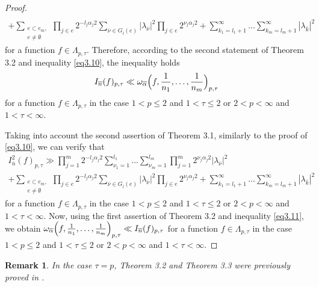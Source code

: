 \documentclass[12pt]{article}
\theoremstyle{plain}
\newtheorem{rem}{Remark}[section]
\begin{document}
\begin{proof}
\begin{multline}
 \\
  + \sum_{\substack{e\subset e_{m},\\ e\neq \emptyset}} \prod_{j\in e}2^{-l_{j}\alpha_{j}2}\sum\limits_{\overline{\nu}\in G_{\overline{l}}(e)}|\lambda_{\overline{\nu}}|^{2}\prod_{j\in e}2^{\nu_{j}\alpha_{j}2}  + \sum\limits_{k_{1}=l_{1}+1}^{\infty}...\sum\limits_{k_{m}=l_{m}+1}^{\infty}|\lambda_{\overline{k}}|^{2}
\end{multline} 
for a function $f \in \Lambda_{p ,\tau}$.  Therefore, according to the second statement of Theorem 3.2 and inequality \eqref{eq3.10}, the inequality holds
 \begin{equation*}
I_{\overline{n}}(f)_{p, \tau} \ll \omega_{\overline\alpha}\Bigl(f,\frac{1}{n_{1}},\ldots, \frac{1}{n_{m}}\Bigr)_{p, \tau}
\end{equation*}
for a function $f \in \Lambda_{p ,\tau}$ in the case 
  $1<p\leqslant 2$ and $1<\tau \leqslant 2$ or $2< p<\infty$ and $1<\tau <\infty$. 
  
Taking into account the second assertion of Theorem 3.1, similarly to the proof of \eqref{eq3.10}, we can verify that
    \begin{multline}\label{eq3.11}
 I_{\overline{n}}^{2}(f)_{p, \tau} \gg \prod_{j=1}^{m}2^{-l_{j}\alpha_{j}2}\sum\limits_{\nu_{1}=1}^{l_{1}}...\sum\limits_{\nu_{m}=1}^{l_{m}}\prod_{j=1}^{m}2^{\nu_{j}\alpha_{j}2}|\lambda_{\overline{\nu}}|^{2}
 \\
  + \sum_{\substack{e\subset e_{m},\\ e\neq \emptyset}} \prod_{j\in e}2^{-l_{j}\alpha_{j}2}\sum\limits_{\overline{\nu}\in G_{\overline{l}}(e)}|\lambda_{\overline{\nu}}|^{2}\prod_{j\in e}2^{\nu_{j}\alpha_{j}2}  + \sum\limits_{k_{1}=l_{1}+1}^{\infty}...\sum\limits_{k_{m}=l_{m}+1}^{\infty}|\lambda_{\overline{k}}|^{2}
\end{multline}
  for a function    $f \in \Lambda_{p ,\tau}$ in the case  
   $1<p\leqslant 2$ and $1<\tau \leqslant 2$ or $2< p<\infty$ and $1<\tau <\infty$.
Now, using the first assertion of Theorem 3.2 and inequality \eqref{eq3.11}, we obtain
$\omega_{\overline\alpha}\Bigl(f,\frac{1}{n_{1}},\ldots, \frac{1}{n_{m}}\Bigr)_{p, \tau}\ll I_{\overline{n}}(f)_{p, \tau}$ 
for a function $f \in \Lambda_{p ,\tau}$ in the case $1<p\leqslant 2$ and $1<\tau \leqslant 2$ or $2< p<\infty$ and $1<\tau <\infty$. 
 \end{proof}
\begin{rem}\label{rem3.3}
In the case $\tau = p$, Theorem 3.2 and Theorem 3.3 were previously proved in \cite[Theorem 7.3 and Theorem 9.3]{17}.
\end{rem}  
  
\end{document}
